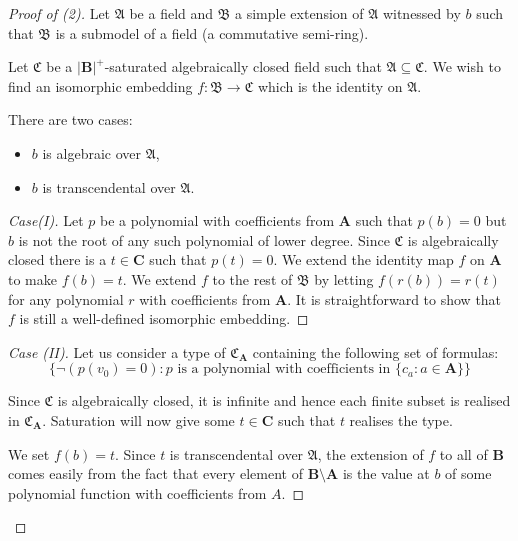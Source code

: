 \documentclass[titlepage, oneside]{amsbook}
\theoremstyle{plain}
\theoremstyle{definition}
\theoremstyle{remark}
\newcommand{\seq}{\ensuremath{\subseteq}}
\newcommand{\ma}{\ensuremath{\mathfrak{A}}}
\newcommand{\mb}{\ensuremath{\mathfrak{B}}}
\newcommand{\mc}{\ensuremath{\mathfrak{C}}}
\newcommand{\ba}{\ensuremath{\mathbf{A}}}
\newcommand{\bb}{\ensuremath{\mathbf{B}}}
\newcommand{\bc}{\ensuremath{\mathbf{C}}}
\begin{document}
\begin{proof}[Proof of (2)] Let $\ma$  be a field and $\mb$ a 
simple extension of $\ma$ witnessed by $b$ such that $\mb$ is a
submodel of a field (a commutative semi-ring).

Let $\mc$ be a $|\bb|^+$-saturated algebraically closed field such that 
$\ma \seq \mc$.
We wish to find an isomorphic embedding $f: \mb \to \mc$ which is the 
identity on $\ma$.

There are two cases:
\begin{itemize}
\item[(I)] $b$ is algebraic over $\ma$,
\item[(II)] $b$ is transcendental over $\ma$.

\end{itemize}


\begin{proof}[Case(I)] Let $p$ be a polynomial with coefficients from
$\ba$ such that $p (b) =0$ but $b$ is not the root of any such
polynomial of lower degree.  Since $\mc$ is algebraically closed there
is a $t \in \bc$ such that $p (t) = 0$.  We extend the identity map
$f$ on $\ba$ to make $f(b) = t$.  We extend $f$ to the rest of $\mb$ by
letting $f(r(b)) = r(t)$ for any polynomial $r$ with coefficients from
$\ba$.  It is straightforward to show that $f$ is still a well-defined
isomorphic embedding.


\renewcommand{\qedsymbol}{}
\end{proof}


\begin{proof}[Case (II)] Let us consider a type of
$\mc_{\ba}$ containing 
the following set of formulas: 
\[ 
   \{ \neg (p(v_0) = 0) : p \text{ is a polynomial with coefficients in } 
   \{ c_a : a \in \ba \} \} 
\]

Since $\mc$ is algebraically closed, it is infinite and hence each finite 
subset is realised in $\mc_{\ba}$.
Saturation will now give some $t \in \bc$ such that $t$ realises the 
type. 

We set $f(b) = t$. Since $t$ is transcendental over $\ma$, the extension 
of $f$ to all of $\bb$ comes easily from the fact that every element of
$\bb \setminus \ba$ is the value at $b$ of some polynomial function
with coefficients from $A$. 
\renewcommand{\qedsymbol}{}
\end{proof}

\end{proof}
\end{document}
